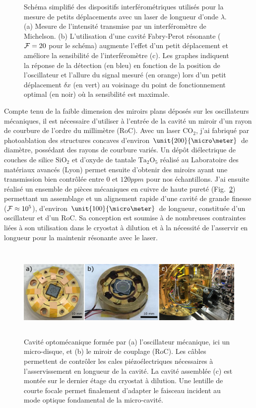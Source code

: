 \documentclass[12pt,a4paper]{article}
\newcommand{\uroc}{\micro RoC}
\begin{document}
\begin{figure}
\caption{Schéma simplifié des dispositifs interférométriques utilisés pour la mesure de petits déplacements avec un laser de longueur d'onde $\lambda$.
(a) Mesure de l'intensité transmise par un interféromètre de Michelson.
(b) L'utilisation d'une cavité Fabry-Perot résonante (${\cal{F}}=20$ pour le schéma) augmente l'effet d'un petit déplacement et améliore la sensibilité de l'interféromètre (c).
Les graphes indiquent la réponse de la détection (en bleu) en fonction de la position de l'oscillateur et l'allure du signal mesuré (en orange) lors d'un petit déplacement $\delta x$ (en vert) au voisinage du point de fonctionnement optimal (en noir) où la sensibilité est maximale.}
\label{fig:detection_scheme}
\end{figure}

Compte tenu de la faible dimension des miroirs plans déposés sur les oscillateurs mécaniques, il est nécessaire d'utiliser à l'entrée de la cavité un miroir d'un rayon de courbure de l'ordre du millimètre (\uroc).
Avec un laser $\mathrm{CO_2}$, j'ai fabriqué par photoablation des structures concaves d'environ $\unit{200}{\micro\meter}$ de diamètre, possédant des rayons de courbure variés.
Un dépôt diélectrique de couches de silice $\mathrm{SiO_2}$ et d'oxyde de tantale $\mathrm{Ta_2O_5}$ réalisé au Laboratoire des matériaux avancés (Lyon) permet ensuite d'obtenir des miroirs ayant une transmission bien contrôlée entre 0 et $\unit{120}{ppm}$ pour nos échantillons.
J'ai ensuite réalisé un ensemble de pièces mécaniques en cuivre de haute pureté (Fig.~\ref{fig:cavity}) permettant un assemblage et un alignement rapide d'une cavité de grande finesse (${\cal{F}}\approx 10^5$), d'environ $\unit{100}{\micro\meter}$ de longueur, constituée d'un oscillateur et d'un \uroc.
Sa conception est soumise à de nombreuses contraintes liées à son utilisation dans le cryostat à dilution et à la nécessité de l'asservir en longueur pour la maintenir résonante avec le laser.

\begin{figure}
\center
\includegraphics[height=129pt]{figures/optomechanical_cavity_small.png}
\caption{Cavité optomécanique formée par (a) l'oscillateur mécanique, ici un micro-disque, et (b) le miroir de couplage (\uroc).
Les câbles permettent de contrôler les cales piézoélectriques nécessaires à l'asservissement en longueur de la cavité.
La cavité assemblée (c) est montée sur le dernier étage du cryostat à dilution.
Une lentille de courte focale permet finalement d'adapter le faisceau incident au mode optique fondamental de la micro-cavité.}
\label{fig:cavity}
\end{figure}
\end{document}
